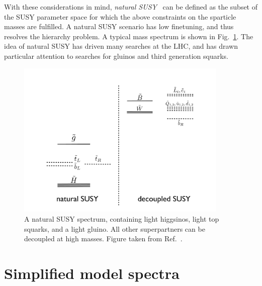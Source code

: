 With these considerations in mind, \textit{natural SUSY}~\cite{Barbieri:2009ev,Papucci:2011wy} can
be defined as the subset of the SUSY parameter space for which the above constraints on the
sparticle masses are fulfilled. 
A natural SUSY scenario has low finetuning, and thus resolves the hierarchy problem. A typical mass
spectrum is shown in Fig.~\ref{fig:natural_spectrum}. The idea of natural SUSY has driven many
searches at the LHC, and has drawn particular attention to searches for gluinos and third
generation squarks. 

\begin{figure}[t]
  \centering
  \includegraphics[width=0.9\textwidth]{figures/susy/NaturalSpec}
  \caption{ A natural SUSY spectrum, containing light higgsinos, light top squarks, and a light
gluino. All other superpartners can be decoupled at high masses. Figure taken from
Ref.~\cite{Papucci:2011wy}.
  \label{fig:natural_spectrum}}
\end{figure}



\section{Simplified model spectra \label{sec:susy_sms}}

